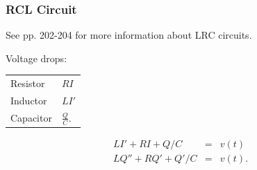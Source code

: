 \begin{frame}
  \frametitle{RCL Circuit}

  See pp. 202-204 for more information about LRC circuits.

  Voltage drops: \\
  \begin{tabular}{l@{~$=$~}l}
    Resistor & $RI$ \\
    Inductor & $LI'$ \\
    Capacitor & $\frac{Q}{C}$.
  \end{tabular}

  \begin{eqnarray*}
    L I' + RI + Q/C & = & v(t) \\
    L Q'' + RQ' + Q'/C & = & v(t).
  \end{eqnarray*}

\end{frame}



